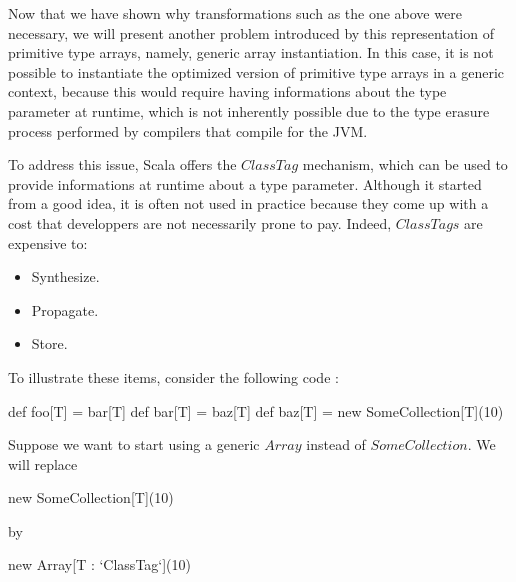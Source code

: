 
Now that we have shown why transformations such as the one above were necessary, we will present another problem introduced by this representation of primitive type arrays, namely, generic array instantiation. In this case, it is not possible to instantiate the optimized version of primitive type arrays in a generic context, because this would require having informations about the type parameter at runtime, which is not inherently possible due to the type erasure process performed by compilers that compile for the JVM. 


To address this issue, Scala offers the $ClassTag$ mechanism, which can be used to provide informations at runtime about a type parameter. Although it started from a good idea, it is often not used in practice because they come up with a cost that developpers are not necessarily prone to pay. Indeed, $ClassTags$ are expensive to:


\begin{itemize}
  \item Synthesize.
  \item Propagate.
  \item Store.
\end{itemize}

To illustrate these items, consider the following code : 

\begin{lstlisting-nobreak}
  def foo[T] = bar[T]
  def bar[T] = baz[T]
  def baz[T] = new SomeCollection[T](10)
\end{lstlisting-nobreak}

Suppose we want to start using a generic $Array$ instead of $SomeCollection$. We will replace
 
\begin{lstlisting-nobreak} 
  new SomeCollection[T](10) 
\end{lstlisting-nobreak}
 
by
 
\begin{lstlisting-nobreak} 
  new Array[T : `ClassTag`](10) 
\end{lstlisting-nobreak}

